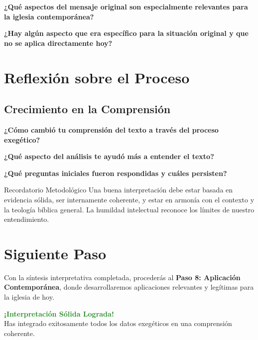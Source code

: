 \documentclass[11pt,a4paper]{article}
\begin{document}
\textbf{¿Qué aspectos del mensaje original son especialmente relevantes para la iglesia contemporánea?}
\vspace{3cm}

\textbf{¿Hay algún aspecto que era específico para la situación original y que no se aplica directamente hoy?}
\vspace{3cm}

\section{Reflexión sobre el Proceso}

\subsection{Crecimiento en la Comprensión}

\textbf{¿Cómo cambió tu comprensión del texto a través del proceso exegético?}
\vspace{3cm}

\textbf{¿Qué aspecto del análisis te ayudó más a entender el texto?}
\vspace{2cm}

\textbf{¿Qué preguntas iniciales fueron respondidas y cuáles persisten?}
\vspace{3cm}

\begin{infobox}{Recordatorio Metodológico}
Una buena interpretación debe estar basada en evidencia sólida, ser internamente coherente, y estar en armonía con el contexto y la teología bíblica general. La humildad intelectual reconoce los límites de nuestro entendimiento.
\end{infobox}

\section{Siguiente Paso}

Con la síntesis interpretativa completada, procederás al \textbf{Paso 8: Aplicación Contemporánea}, donde desarrollaremos aplicaciones relevantes y legítimas para la iglesia de hoy.

\vspace{1cm}

\begin{center}
\begin{tcolorbox}[colback=mintgreen!20, colframe=mintgreen, width=0.7\textwidth]
\centering
\textcolor{forestgreen}{\textbf{¡Interpretación Sólida Lograda!}}\\
\textcolor{papergray}{Has integrado exitosamente todos los datos exegéticos en una comprensión coherente.}
\end{tcolorbox}
\end{center}
\end{document}
